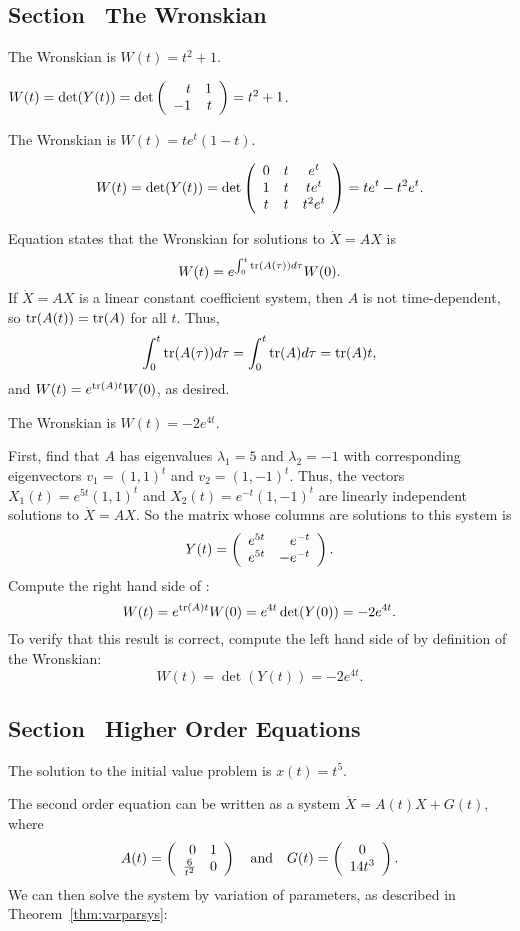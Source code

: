 \subsection*{Section~\protect{\ref{S:wronskian}} The Wronskian}

 \ans The Wronskian is $W(t) = t^2 + 1$.

\soln $W(t) = \det(Y(t)) = \det\left(\begin{array}{rr} t & 1\\ -1 &t\end{array}\right) = t^2 + 1$.

 \ans The Wronskian is $W(t) = te^t(1 - t)$.

\soln
\[
W(t) = \det(Y(t)) = \det\left(\begin{array}{ccc} 0 & t & e^t \\ 1 & t & te^t \\ t & t & t^2e^t\end{array}\right)
= te^t - t^2e^t.
\]

 Equation 
states that the Wronskian for solutions to $\dot{X} = AX$ is
\[
W(t) = e^{\int_0^t{\rm tr}(A(\tau))d\tau}W(0).
\]
If $\dot{X} = AX$ is a linear constant coefficient system, then $A$ is not
time-dependent, so ${\rm tr}(A(t)) = {\rm tr}(A)$ for all $t$.  Thus,
\[
\int_0^t{\rm tr}(A(\tau))d\tau = \int_0^t{\rm tr}(A)d\tau = {\rm tr}(A)t,
\]
and $W(t) = e^{{\rm tr}(A)t}W(0)$, as desired.

 \ans The Wronskian is $W(t) = -2e^{4t}$.

\soln First, find that $A$ has eigenvalues $\lambda_1 = 5$ and
$\lambda_2 = -1$ with corresponding eigenvectors $v_1 = (1,1)^t$ and
$v_2 = (1,-1)^t$.  Thus, the vectors $X_1(t) = e^{5t}(1,1)^t$ and
$X_2(t) = e^{-t}(1,-1)^t$ are linearly independent solutions to
$\dot{X} = AX$.  So the matrix whose columns are solutions to this
system is
\[
Y(t) = \left(\begin{array}{rr} e^{5t} & e^{-t}\\ e^{5t} &-e^{-t}\end{array}\right).
\]
Compute the right hand side of :
\[
W(t) = e^{{\rm tr}(A)t}W(0) = e^{4t}\det(Y(0)) = -2e^{4t}.
\]
To verify that this result is correct, compute the left hand side of
 by definition of the Wronskian:
\[
W(t) = \det(Y(t)) = -2e^{4t}.
\]



\subsection*{Section~\protect{\ref{S:RO}} Higher Order Equations}

 \ans The solution to the initial value problem is 
$x(t) = t^5$.

\soln The second order equation can be written as a system
$\dot{X} = A(t)X + G(t)$, where
\[
A(t) = \left(\begin{array}{rr} 0 & 1\\ \frac{6}{t^2} &0\end{array}\right) \quad\mbox{and}\quad G(t) = \left(\begin{array}{c} 0 \\ 14t^3\end{array}\right).
\]
We can then solve the system by variation of parameters, as described in
Theorem~\ref{thm:varparsys}:

